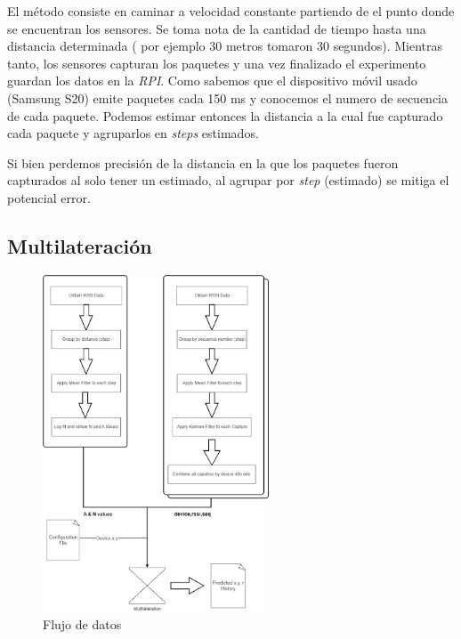 El método consiste en caminar a velocidad constante partiendo de el punto donde se encuentran los sensores. Se toma nota de la cantidad de tiempo hasta una distancia determinada ( por ejemplo 30 metros tomaron 30 segundos). Mientras tanto, los sensores capturan los paquetes y una vez finalizado el experimento guardan los datos en la \textit{RPI}.
Como sabemos que el dispositivo móvil usado (Samsung S20) emite paquetes cada 150 ms y conocemos el numero de secuencia de cada paquete. Podemos estimar entonces la distancia a la cual fue capturado cada paquete y agruparlos en \textit{steps} estimados.

Si bien perdemos precisión de la distancia en la que los paquetes fueron capturados al solo tener un estimado, al agrupar por \textit{step} (estimado) se mitiga el potencial error.

\subsection{Multilateración}

 \begin{figure}[!htb]
	\centering
	\includegraphics[width=0.6\textwidth]{Figuras/infraestructure/infra-diagram.png}
	\captionsetup{margin=2cm}
	\caption[Flujo de datos]{Flujo de datos}
	\label{fig:infra-diagram}
\end{figure}

